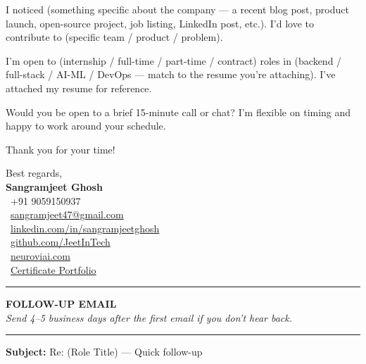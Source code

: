 \documentclass[11pt]{article}
\newcommand{\blank}[1]{\underline{\hspace{#1}}}
\begin{document}
I noticed \blank{5cm} (something specific about the company — a recent blog post, product launch, open-source project, job listing, LinkedIn post, etc.). I'd love to contribute to \blank{4cm} (specific team / product / problem).

I'm open to \blank{4cm} (internship / full-time / part-time / contract) roles in \blank{4cm} (backend / full-stack / AI-ML / DevOps — match to the resume you're attaching). I've attached my resume for reference.

Would you be open to a brief 15-minute call or chat? I'm flexible on timing and happy to work around your schedule.

\vspace{6pt}

Thank you for your time!

\vspace{14pt}

Best regards, \\[2pt]
\textbf{Sangramjeet Ghosh} \\
\faPhone\ +91 9059150937 \\
\faEnvelope\ \href{mailto:sangramjeet47@gmail.com}{sangramjeet47@gmail.com} \\
\faLinkedin\ \href{https://www.linkedin.com/in/sangramjeetghosh}{linkedin.com/in/sangramjeetghosh} \\
\faGithub\ \href{https://github.com/JeetInTech}{github.com/JeetInTech} \\
\faGlobe\ \href{https://neuroviai.com}{neuroviai.com} \\
\faFolder\ \href{https://drive.google.com/drive/folders/1ZQd-DeX-rXlEVDTwDJfjLjnG7iPc_fEw}{Certificate Portfolio}

\vspace{20pt}
\noindent\rule{\textwidth}{0.6pt}


\begin{center}
{\large \textbf{FOLLOW-UP EMAIL}} \\[4pt]
{\small \textit{Send 4--5 business days after the first email if you don't hear back.}}
\end{center}

\noindent\rule{\textwidth}{0.2pt}

\vspace{6pt}

\textbf{Subject:} Re: \blank{3cm} (Role Title) — Quick follow-up
\end{document}

